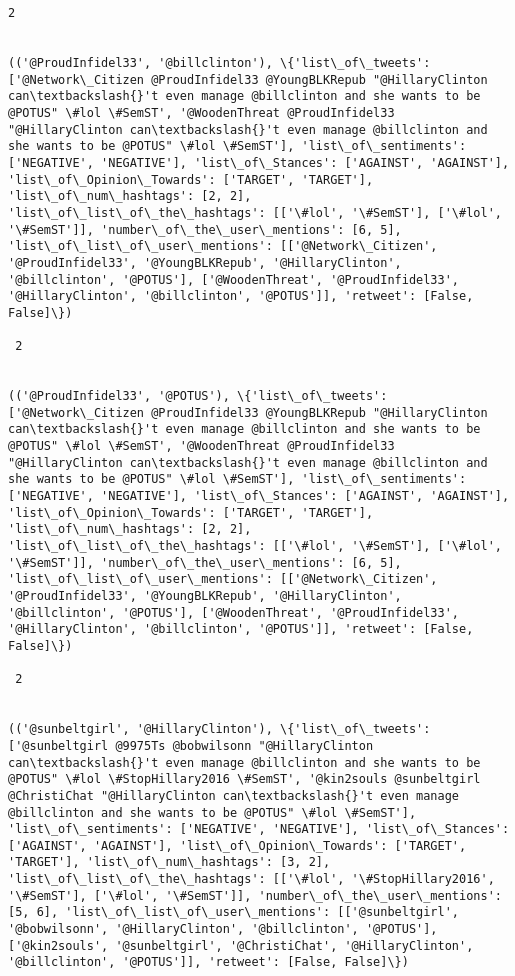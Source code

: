 \documentclass[11pt]{article}
\begin{document}
\begin{Verbatim}[commandchars=\\\{\}]
 2
 

(('@ProudInfidel33', '@billclinton'), \{'list\_of\_tweets': ['@Network\_Citizen @ProudInfidel33 @YoungBLKRepub "@HillaryClinton can\textbackslash{}'t even manage @billclinton and she wants to be @POTUS" \#lol \#SemST', '@WoodenThreat @ProudInfidel33 "@HillaryClinton can\textbackslash{}'t even manage @billclinton and she wants to be @POTUS" \#lol \#SemST'], 'list\_of\_sentiments': ['NEGATIVE', 'NEGATIVE'], 'list\_of\_Stances': ['AGAINST', 'AGAINST'], 'list\_of\_Opinion\_Towards': ['TARGET', 'TARGET'], 'list\_of\_num\_hashtags': [2, 2], 'list\_of\_list\_of\_the\_hashtags': [['\#lol', '\#SemST'], ['\#lol', '\#SemST']], 'number\_of\_the\_user\_mentions': [6, 5], 'list\_of\_list\_of\_user\_mentions': [['@Network\_Citizen', '@ProudInfidel33', '@YoungBLKRepub', '@HillaryClinton', '@billclinton', '@POTUS'], ['@WoodenThreat', '@ProudInfidel33', '@HillaryClinton', '@billclinton', '@POTUS']], 'retweet': [False, False]\})

 2
 

(('@ProudInfidel33', '@POTUS'), \{'list\_of\_tweets': ['@Network\_Citizen @ProudInfidel33 @YoungBLKRepub "@HillaryClinton can\textbackslash{}'t even manage @billclinton and she wants to be @POTUS" \#lol \#SemST', '@WoodenThreat @ProudInfidel33 "@HillaryClinton can\textbackslash{}'t even manage @billclinton and she wants to be @POTUS" \#lol \#SemST'], 'list\_of\_sentiments': ['NEGATIVE', 'NEGATIVE'], 'list\_of\_Stances': ['AGAINST', 'AGAINST'], 'list\_of\_Opinion\_Towards': ['TARGET', 'TARGET'], 'list\_of\_num\_hashtags': [2, 2], 'list\_of\_list\_of\_the\_hashtags': [['\#lol', '\#SemST'], ['\#lol', '\#SemST']], 'number\_of\_the\_user\_mentions': [6, 5], 'list\_of\_list\_of\_user\_mentions': [['@Network\_Citizen', '@ProudInfidel33', '@YoungBLKRepub', '@HillaryClinton', '@billclinton', '@POTUS'], ['@WoodenThreat', '@ProudInfidel33', '@HillaryClinton', '@billclinton', '@POTUS']], 'retweet': [False, False]\})

 2
 

(('@sunbeltgirl', '@HillaryClinton'), \{'list\_of\_tweets': ['@sunbeltgirl @9975Ts @bobwilsonn "@HillaryClinton can\textbackslash{}'t even manage @billclinton and she wants to be @POTUS" \#lol \#StopHillary2016 \#SemST', '@kin2souls @sunbeltgirl @ChristiChat "@HillaryClinton can\textbackslash{}'t even manage @billclinton and she wants to be @POTUS" \#lol \#SemST'], 'list\_of\_sentiments': ['NEGATIVE', 'NEGATIVE'], 'list\_of\_Stances': ['AGAINST', 'AGAINST'], 'list\_of\_Opinion\_Towards': ['TARGET', 'TARGET'], 'list\_of\_num\_hashtags': [3, 2], 'list\_of\_list\_of\_the\_hashtags': [['\#lol', '\#StopHillary2016', '\#SemST'], ['\#lol', '\#SemST']], 'number\_of\_the\_user\_mentions': [5, 6], 'list\_of\_list\_of\_user\_mentions': [['@sunbeltgirl', '@bobwilsonn', '@HillaryClinton', '@billclinton', '@POTUS'], ['@kin2souls', '@sunbeltgirl', '@ChristiChat', '@HillaryClinton', '@billclinton', '@POTUS']], 'retweet': [False, False]\})


\end{Verbatim}
\end{document}
